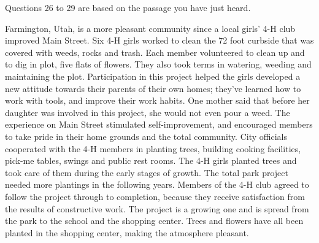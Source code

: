 \documentclass[12pt]{article}
\begin{document}
\vspace{0.00mm}

\vspace{0.00mm}
\setlength{\parindent}{0.00mm}
\setlength{\leftskip}{-6.23mm}
\setlength{\rightskip}{0.00mm}

Questions 26 to 29 are based on the passage you have just heard.
\vspace{0.00mm}

\vspace{0.00mm}
\setlength{\parindent}{0.00mm}
\setlength{\leftskip}{-6.23mm}
\setlength{\rightskip}{0.00mm}


\vspace{0.00mm}

\vspace{0.00mm}
\setlength{\parindent}{0.00mm}
\setlength{\leftskip}{-6.23mm}
\setlength{\rightskip}{0.00mm}

Farmington, Utah, is a more pleasant community since a local girls' 4-H club improved Main Street. Six 4-H girls worked to clean the 72 foot curbside that was covered with weeds, rocks and trash. Each member volunteered to clean up and to dig in plot, five flats of flowers. They also took terms in watering, weeding and maintaining the plot. Participation in this project helped the girls developed a new attitude towards their parents of their own homes; they've learned how to work with tools, and improve their work habits. One mother said that before her daughter was involved in this project, she would not even pour a weed. The experience on Main Street stimulated self-improvement, and encouraged members to take pride in their home grounds and the total community. City officials cooperated with the 4-H members in planting trees, building cooking facilities, pick-me tables, swings and public rest rooms. The 4-H girls planted trees and took care of them during the early stages of growth. The total park project needed more plantings in the following years. Members of the 4-H club agreed to follow the project through to completion, because they receive satisfaction from the results of constructive work. The project is a growing one and is spread from the park to the school and the shopping center. Trees and flowers have all been planted in the shopping center, making the atmosphere pleasant.
\vspace{0.00mm}

\vspace{0.00mm}
\setlength{\parindent}{0.00mm}
\setlength{\leftskip}{-6.23mm}
\setlength{\rightskip}{0.00mm}
\end{document}
